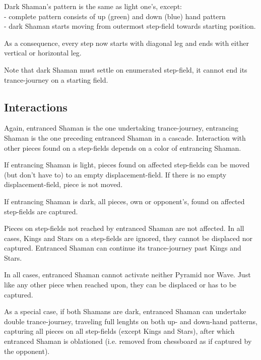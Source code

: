 \vspace*{-0.5\baselineskip}
Dark Shaman's pattern is the same as light one's, except: \\
- complete pattern consists of up (green) and down (blue) hand pattern \\
- dark Shaman starts moving from outermost step-field towards starting position.

As a consequence, every step now starts with diagonal leg and ends with either
vertical or horizontal leg.

Note that dark Shaman must settle on enumerated step-field, it cannot end its
trance-journey on a starting field.


\subsection*{Interactions}
\label{sec:Conquest of Tlalocan/Trance-journey/Interactions}

Again, entranced Shaman is the one undertaking trance-journey, entrancing Shaman
is the one preceding entranced Shaman in a cascade. Interaction with other pieces
found on a step-fields depends on a color of entrancing Shaman.

If entrancing Shaman is light, pieces found on affected step-fields can be moved
(but don't have to) to an empty displacement-field. If there is no empty
displacement-field, piece is not moved.

If entrancing Shaman is dark, all pieces, own or opponent's, found on affected
step-fields are captured.

Pieces on step-fields not reached by entranced Shaman are not affected. In all
cases, Kings and Stars on a step-fields are ignored, they cannot be displaced
nor captured. Entranced Shaman can continue its trance-journey past Kings and Stars.

In all cases, entranced Shaman cannot activate neither Pyramid nor Wave. Just like
any other piece when reached upon, they can be displaced or has to be captured.

As a special case, if both Shamans are dark, entranced Shaman can undertake double
trance-journey, traveling full lenghts on both up- and down-hand patterns, capturing
all pieces on all step-fields (except Kings and Stars), after which entranced Shaman
is oblationed (i.e. removed from chessboard as if captured by the opponent).

